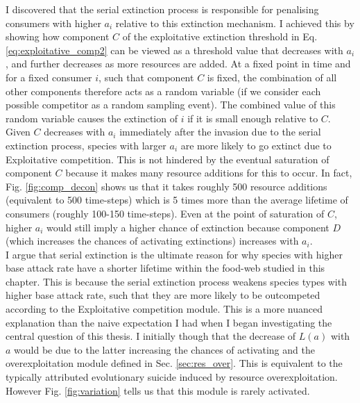 \documentclass[a4paper]{report}
\begin{document}
{I discovered that the serial extinction process is responsible for penalising consumers with higher $a_i$ relative to this extinction mechanism. I achieved this by showing how component $C$ of the exploitative extinction threshold in Eq. \eqref{eq:exploitative_comp2} can be viewed as a threshold value that decreases with $a_i$, and further decreases as more resources are added. At a fixed point in time and for a fixed consumer $i$, such that component $C$ is fixed, the combination of all other components therefore acts as a random variable (if we consider each possible competitor as a random sampling event). The combined value of this random variable causes the extinction of $i$ if it is small enough relative to $C$. Given $C$ decreases with $a_i$ immediately after the invasion due to the serial extinction process, species with larger $a_i$ are more likely to go extinct due to Exploitative competition. This is not hindered by the eventual saturation of component $C$ because it makes many resource additions for this to occur. In fact, Fig. \ref{fig:comp_decon} shows us that it takes roughly 500 resource additions (equivalent to 500 time-steps) which is 5 times more than the average lifetime of consumers (roughly 100-150 time-steps). Even at the point of saturation of $C$, higher $a_i$ would still imply a higher chance of extinction because component $D$ (which increases the chances of activating extinctions) increases with $a_i$. \\
 
I argue that serial extinction is the ultimate reason for why species with higher base attack rate have a shorter lifetime within the food-web studied in this chapter. This is because the serial extinction process weakens species types with higher base attack rate, such that they are more likely to be outcompeted according to the Exploitative competition module. This is a more nuanced explanation than the naive expectation I had when I began investigating the central question of this thesis. I initially though that the decrease of $L(a)$ with $a$ would be due to the latter increasing the chances of activating and the overexploitation module defined in Sec. \ref{sec:res_over}. This is equivalent to the typically attributed evolutionary suicide induced by resource overexploitation. However Fig. \ref{fig:variation} tells us that this module is rarely activated.\\

}
\end{document}
